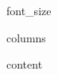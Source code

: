 \documentclass[10pt,{{ orientation }}]{article}
\begin{document}
{{ font_size }}

\begin{multicols*}{ {{ columns }} } %
\raggedright

{{content}} 

\end{multicols*}
\end{document}

